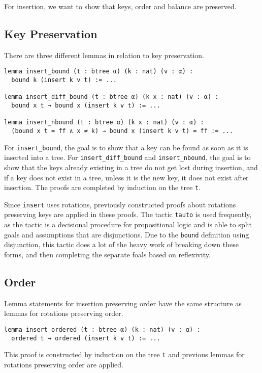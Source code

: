 For insertion, we want to show that keys, order and balance are preserved.

\subsection*{Key Preservation}
There are three different lemmas in relation to key preservation.

\begin{lstlisting}
lemma insert_bound (t : btree α) (k : nat) (v : α) :
  bound k (insert k v t) := ...

lemma insert_diff_bound (t : btree α) (k x : nat) (v : α) :
  bound x t → bound x (insert k v t) := ...

lemma insert_nbound (t : btree α) (k x : nat) (v : α) :
  (bound x t = ff ∧ x ≠ k) → bound x (insert k v t) = ff := ...
\end{lstlisting}

For \lstinline{insert_bound}, the goal is to show that a key can be found as soon as it is inserted into a tree. For \lstinline{insert_diff_bound} and \lstinline{insert_nbound}, the goal is to show that the keys already existing in a tree do not get lost during insertion, and if a key does not exist in a tree, unless it is the new key, it does not exist after insertion. The proofs are completed by induction on the tree \lstinline{t}.

Since \lstinline{insert} uses rotations, previously constructed proofs about rotations preserving keys are applied in these proofs. The tactic \lstinline{tauto} is used frequently, as the tactic is a decisional procedure for propositional logic and is able to split goals and assumptions that are disjunctions. Due to the \lstinline{bound} definition using disjunction, this tactic does a lot of the heavy work of breaking down these forms, and then completing the separate foals based on reflexivity.

\subsection*{Order}
Lemma statements for insertion preserving order have the same structure as lemmas for rotations preserving order.

\begin{lstlisting}
lemma insert_ordered (t : btree α) (k : nat) (v : α) :
  ordered t → ordered (insert k v t) := ...
\end{lstlisting}

This proof is constructed by induction on the tree \lstinline{t} and previous lemmas for rotations preserving order are applied. 

